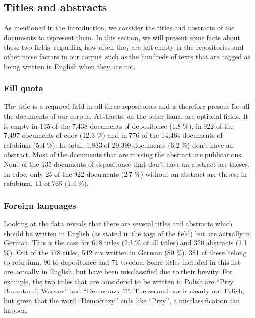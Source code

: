 \subsection{Titles and abstracts} \label{repo_analysis_data}

As mentioned in the introduction, we consider the titles and abstracts of the documents to represent them. In this section, we will present some facts about these two fields, regarding how often they are left empty in the repositories and other noise factors in our corpus, such as the hundreds of texts that are tagged as being written in English when they are not.

\subsubsection{Fill quota}

The title is a required field in all three repositories and is therefore present for all the documents of our corpus. Abstracts, on the other hand, are optional fields. It is empty in 135 of the 7,438 documents of depositonce (1.8 \%), in 922 of the 7,497 documents of edoc (12.3 \%) and in 776 of the 14,464 documents of refubium (5.4 \%). In total, 1,833 of 29,399 documents (6.2 \%) don't have an abstract. Most of the documents that are missing the abstract are publications. None of the 135 documents of depositonce that don't have an abstract are theses. In edoc, only 25 of the 922 documents (2.7 \%) without an abstract are theses; in refubium, 11 of 765 (1.4 \%).

\subsubsection{Foreign languages}

Looking at the data reveals that there are several titles and abstracts which should be written in English (as stated in the tags of the field) but are actually in German. This is the case for 678 titles (2.3 \% of all titles) and 320 abstracts (1.1 \%). Out of the 678 titles, 542 are written in German (80 \%). 381 of these belong to refubium, 90 to depositonce and 71 to edoc. Some titles included in this list are actually in English, but have been misclassified due to their brevity. For example, the two titles that are considered to be written in Polish are ``Przy Bazantarni, Warsaw'' and ``Democrazy ?!''. The second one is clearly not Polish, but given that the word ``Democrazy'' ends like ``Przy'', a misclassification can happen.

